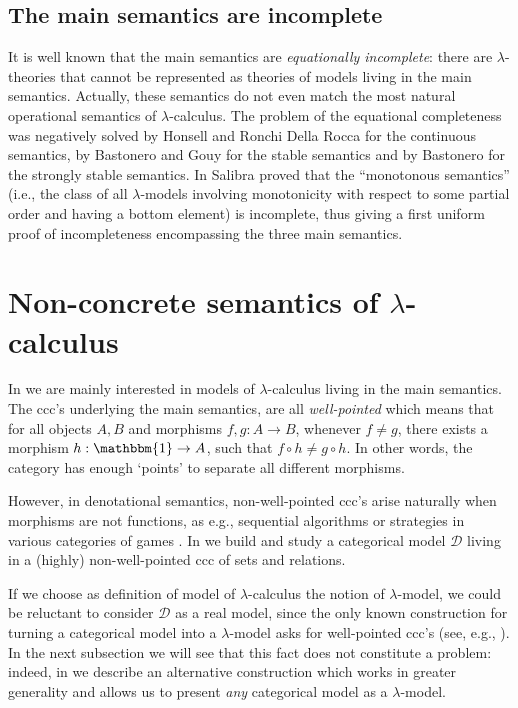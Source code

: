\documentclass[english]{llncs}
\newcommand{\Termobj}{\mathbbm{1}}
\newcommand{\ro}[1]{\mathscr{#1}} \newcommand{\App}{\mathcal{A}}
\newcommand{\comp}{\circ}
\begin{document}
\subsection{The main semantics are incomplete} 

It is well known that the main semantics are {\em equationally incomplete}: 
there are $\lambda$-theories that cannot be represented as theories of models living in the main semantics.
Actually, these semantics do not even match the most natural operational semantics of $\lambda$-calculus.
The problem of the equational completeness was negatively solved by Honsell and Ronchi Della Rocca \cite{HonsellR92} for the 
continuous semantics, by Bastonero and Gouy \cite{BastoneroG99,GouyTh} for the stable semantics and by Bastonero \cite{BastoneroTh} for the strongly stable semantics.
In \cite{Salibra01,Salibra03} Salibra proved that the ``monotonous semantics'' (i.e., the class of all $\lambda$-models involving monotonicity with 
respect to some partial order and having a bottom element) is incomplete, thus giving a first uniform proof of incompleteness encompassing the three 
main semantics.



\section{Non-concrete semantics of $\lambda$-calculus}\label{sec:Non-concrete semantics of lambda-calculus}

In \cite{ManzonettoTh} we are mainly interested in models of $\lambda$-calculus living in the main semantics. 
The ccc's underlying the main semantics, are all {\em well-pointed} which means that for all objects $A,B$ and 
morphisms $f,g:A\to B$, whenever $f\neq g$, there exists a morphism $h:\Termobj\to A$, such that $f\comp h \neq g\comp h$. 
In other words, the category has enough `points' to separate all different morphisms.

However, in denotational semantics, non-well-pointed ccc's arise naturally when morphisms are not functions, as e.g., 
sequential algorithms \cite{BerryC85} or strategies in various categories of games \cite{AbramskyJM00,HylandO00}. 
In \cite[Chapter~3]{ManzonettoTh} we build and study a categorical model $\ro{D}$ living in a (highly) non-well-pointed ccc of 
sets and relations. 

If we choose as definition of model of $\lambda$-calculus the notion of $\lambda$-model, we could be reluctant to consider $\ro{D}$ as a real model, 
since the only known construction for turning a categorical model into a $\lambda$-model asks for well-pointed ccc's (see, e.g., \cite[Ch.~5]{Bare}).
In the next subsection we will see that this fact does not constitute a problem: 
indeed, in \cite[Chapter~2]{ManzonettoTh} we describe an alternative construction which works in greater generality and allows us to present 
{\em any} categorical model as a $\lambda$-model.
\end{document}
